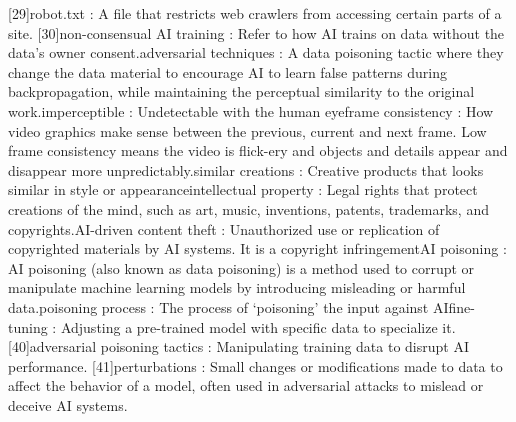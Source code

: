 [29]robot.txt :  A file that restricts web crawlers from accessing certain parts of a site.
[30]non-consensual AI training : Refer to how AI trains on data without the data’s owner consent.\newline
[31]adversarial techniques : A data poisoning tactic where they change the data material to encourage AI to learn false patterns during backpropagation, while maintaining the perceptual similarity to the original work.\newline
[32]imperceptible : Undetectable with the human eye\newline
[33]frame consistency : How video graphics make sense between the previous, current and next frame. Low frame consistency means the video is flick-ery and objects and details appear and disappear more unpredictably.\newline
[34]similar creations : Creative products that looks similar in style or appearance\newline
[35]intellectual property : Legal rights that protect creations of the mind, such as art, music, inventions, patents, trademarks, and copyrights.\newline
[36]AI-driven content theft : Unauthorized use or replication of copyrighted materials by AI systems. It is a copyright infringement\newline
[37]AI poisoning : AI poisoning (also known as data poisoning) is a method used to corrupt or manipulate machine learning models by introducing misleading or harmful data.\newline
[38]poisoning process : The process of ‘poisoning’ the input against AI\newline
[39]fine-tuning : Adjusting a pre-trained model with specific data to specialize it.
[40]adversarial poisoning tactics : Manipulating training data to disrupt AI performance.
[41]perturbations : Small changes or modifications made to data to affect the behavior of a model, often used in adversarial attacks to mislead or deceive AI systems.
